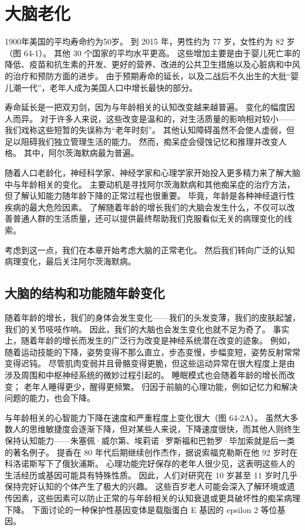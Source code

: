 \chapter{大脑老化}

1900年美国的平均寿命约为50岁。 到 2015 年，男性约为 77 岁，女性约为 82 岁（图 64-1）。 其他 30 个国家的平均水平更高。 这些增加主要是由于婴儿死亡率的降低、疫苗和抗生素的开发、更好的营养、改进的公共卫生措施以及心脏病和中风的治疗和预防方面的进步。 由于预期寿命的延长，以及二战后不久出生的大批“婴儿潮一代”，老年人成为美国人口中增长最快的部分。

寿命延长是一把双刃剑，因为与年龄相关的认知改变越来越普遍。 变化的幅度因人而异。 对于许多人来说，这些改变是温和的，对生活质量的影响相对较小——我们戏称这些短暂的失误称为“老年时刻”。 其他认知障碍虽然不会使人虚弱，但足以阻碍我们独立管理生活的能力。 然而，痴呆症会侵蚀记忆和推理并改变人格。 其中，阿尔茨海默病最为普遍。

随着人口老龄化，神经科学家、神经学家和心理学家开始投入更多精力来了解大脑中与年龄相关的变化。 主要动机是寻找阿尔茨海默病和其他痴呆症的治疗方法，但了解认知能力随年龄下降的正常过程也很重要。 毕竟，年龄是各种神经退行性疾病的最大危险因素。 了解随着年龄的增长我们的大脑会发生什么，不仅可以改善普通人群的生活质量，还可以提供最终帮助我们克服看似无关的病理变化的线索。

考虑到这一点，我们在本章开始考虑大脑的正常老化。 然后我们转向广泛的认知病理变化，最后关注阿尔茨海默病。

\section{大脑的结构和功能随年龄变化}

随着年龄的增长，我们的身体会发生变化——我们的头发变薄，我们的皮肤起皱，我们的关节吱吱作响。 因此，我们的大脑也会发生变化也就不足为奇了。 事实上，随着年龄的增长而发生的广泛行为改变是神经系统潜在改变的迹象。 例如，随着运动技能的下降，姿势变得不那么直立，步态变慢，步幅变短，姿势反射常常变得迟钝。 尽管肌肉变弱并且骨骼变得更脆，但这些运动异常在很大程度上是由涉及周围和中枢神经系统的微妙过程引起的。 睡眠模式也会随着年龄的增长而改变； 老年人睡得更少，醒得更频繁。 归因于前脑的心理功能，例如记忆力和解决问题的能力，也会下降。

与年龄相关的心智能力下降在速度和严重程度上变化很大（图 64-2A）。 虽然大多数人的思维敏捷度会逐渐下降，但对某些人来说，下降速度很快，而其他人则终生保持认知能力——朱塞佩·威尔第、埃莉诺·罗斯福和巴勃罗·毕加索就是后一类的著名例子。 提香在 80 年代后期继续创作杰作，据说索福克勒斯在他 92 岁时在科洛诺斯写下了俄狄浦斯。 心理功能完好保存的老年人很少见，这表明这些人的生活经历或基因可能具有特殊性质。 因此，人们对研究在 10 岁甚至 11 岁时几乎保持完好认知的个体产生了极大的兴趣。 这些百岁老人可能会深入了解环境或遗传因素，这些因素可以防止正常的与年龄相关的认知衰退或更具破坏性的痴呆病理下降。 下面讨论的一种保护性基因变体是载脂蛋白 E 基因的 epsilon 2 等位基因。

